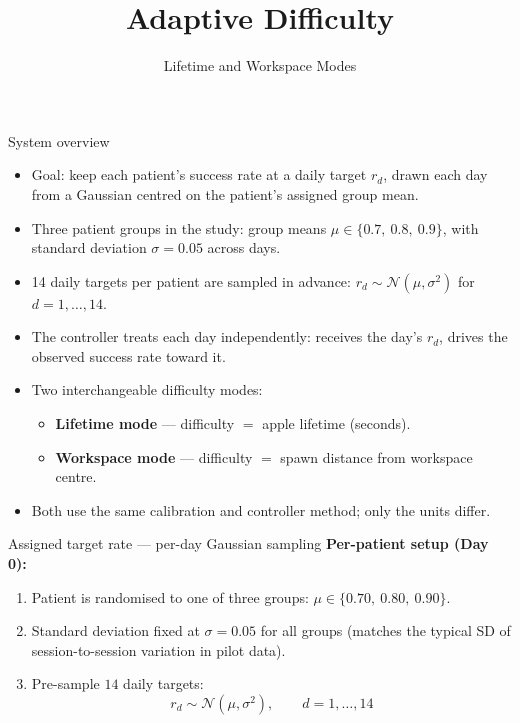 \documentclass[10pt,aspectratio=169]{beamer}
\title[Adaptive Difficulty]{Adaptive Difficulty }
\subtitle{Lifetime and Workspace Modes}
\author{}
\institute{}
\date{}
\newcommand{\target}{r}
\begin{document}
\frame{\titlepage}

\begin{frame}{System overview}
\begin{itemize}
    \item Goal: keep each patient's success rate at a daily target $\target_d$, drawn each day from a Gaussian centred on the patient's assigned group mean.
    \item Three patient groups in the study: group means $\mu \in \{0.7,\ 0.8,\ 0.9\}$, with standard deviation $\sigma = 0.05$ across days.
    \item 14 daily targets per patient are sampled in advance: $\target_d \sim \mathcal{N}(\mu, \sigma^2)$ for $d = 1, \ldots, 14$.
    \item The controller treats each day independently: receives the day's $\target_d$, drives the observed success rate toward it.
    \item Two interchangeable difficulty modes:
    \begin{itemize}
        \item \textbf{Lifetime mode} --- difficulty $=$ apple lifetime (seconds).
        \item \textbf{Workspace mode} --- difficulty $=$ spawn distance from workspace centre.
    \end{itemize}
    \item Both use the same calibration and controller method; only the units differ.
\end{itemize}
\end{frame}

\begin{frame}{Assigned target rate --- per-day Gaussian sampling}
\textbf{Per-patient setup (Day 0):}
\begin{enumerate}
    \item Patient is randomised to one of three groups: $\mu \in \{0.70,\ 0.80,\ 0.90\}$.
    \item Standard deviation fixed at $\sigma = 0.05$ for all groups (matches the typical SD of session-to-session variation in pilot data).
    \item Pre-sample $14$ daily targets:
    \[
    \target_d \sim \mathcal{N}(\mu, \sigma^2), \qquad d = 1, \ldots, 14
    \]

\end{enumerate}

\end{frame}
\end{document}
